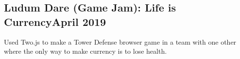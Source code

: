 \documentclass[../Resume.tex]{subfiles}
\begin{document}
	\subsection{Ludum Dare (Game Jam): Life is Currency\null\hfill April 2019}
	\par Used Two.js to make a Tower Defense browser game in a team with one other where the only way to make currency is to lose health.
	\vspace*{-2mm}
\end{document}
